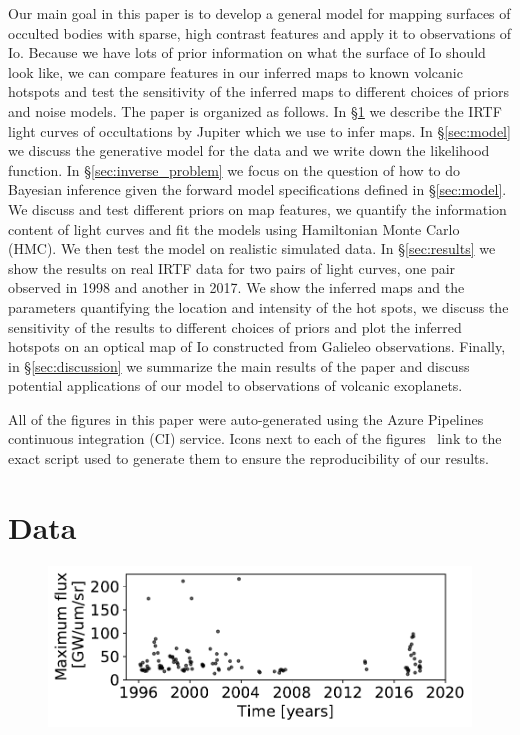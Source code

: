 \documentclass[modern]{aastex62}
\begin{document}
Our main goal in this paper is to develop a general model for mapping surfaces of occulted bodies with sparse, high contrast features and apply it to observations of Io.
Because we have lots of prior information on what the surface of Io should look like, we can compare features in our inferred maps to known volcanic hotspots and test the sensitivity of the inferred maps to different choices of priors and noise models.
The paper is organized as follows.
In \S\ref{sec:data} we describe the IRTF light curves of occultations by Jupiter which we use to infer maps.
In \S\ref{sec:model} we discuss the generative model for the data and we write down the likelihood function.
In \S\ref{sec:inverse_problem} we focus on the question of how to do Bayesian inference given the forward model specifications defined in \S\ref{sec:model}.
We discuss and test different priors on map features, we quantify the information content of light curves and fit the models using Hamiltonian Monte Carlo (HMC). 
We then test the model on realistic simulated data.
In \S\ref{sec:results} we show the results on real IRTF data for two pairs of light curves, one pair observed in 1998 and another in 2017.
We show the inferred maps and the parameters quantifying the location and intensity of the hot spots, we discuss the sensitivity of the results to different choices of priors and plot the inferred hotspots on an optical map of Io constructed from Galieleo observations.
Finally, in \S\ref{sec:discussion} we summarize the main results of the paper and discuss potential applications of our model to observations of volcanic exoplanets.

\vspace{1em}

All of the figures in this paper were auto-generated
using the Azure Pipelines continuous integration (CI) service.
Icons next to each of the figures \codeicon \,
link to the exact script used to generate them to ensure the reproducibility
of our results. 

\section{Data}
\label{sec:data}

\begin{figure}[h!]
    \begin{centering}
    \includegraphics[width=\linewidth]{figures/irtf_max_flux.pdf}
    \end{centering}
\end{figure}
\end{document}
